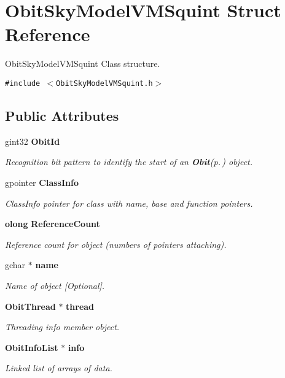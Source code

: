 \section{Obit\-Sky\-Model\-VMSquint Struct Reference}
\label{structObitSkyModelVMSquint}
Obit\-Sky\-Model\-VMSquint Class structure.  


{\tt \#include $<$Obit\-Sky\-Model\-VMSquint.h$>$}

\subsection*{Public Attributes}
\begin{CompactItemize}
\item 
gint32 {\bf Obit\-Id}
\begin{CompactList}\small\item\em Recognition bit pattern to identify the start of an {\bf Obit}{\rm (p.\,\pageref{structObit})} object. \item\end{CompactList}\item 
gpointer {\bf Class\-Info}
\begin{CompactList}\small\item\em Class\-Info pointer for class with name, base and function pointers. \item\end{CompactList}\item 
{\bf olong} {\bf Reference\-Count}
\begin{CompactList}\small\item\em Reference count for object (numbers of pointers attaching). \item\end{CompactList}\item 
gchar $\ast$ {\bf name}
\begin{CompactList}\small\item\em Name of object [Optional]. \item\end{CompactList}\item 
{\bf Obit\-Thread} $\ast$ {\bf thread}
\begin{CompactList}\small\item\em Threading info member object. \item\end{CompactList}\item 
{\bf Obit\-Info\-List} $\ast$ {\bf info}
\begin{CompactList}\small\item\em Linked list of arrays of data. \item\end{CompactList}\item 

\end{CompactItemize}

